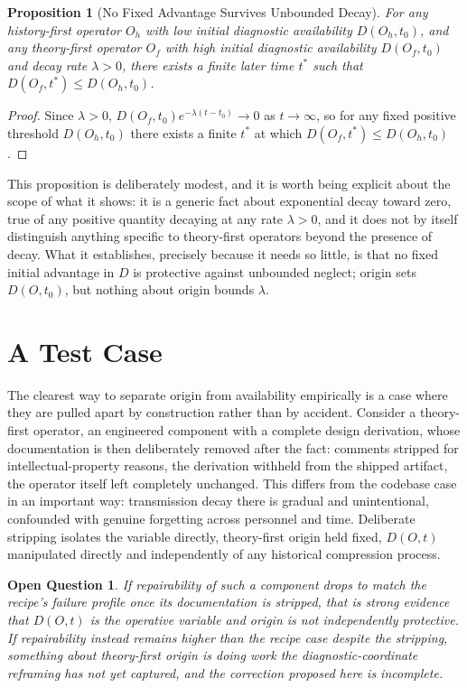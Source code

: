 \documentclass[11pt]{article}
\newtheorem{proposition}{Proposition}[section]
\newtheorem{question}{Open Question}[section]
\begin{document}
\begin{proposition}[No Fixed Advantage Survives Unbounded Decay]
For any history-first operator $O_h$ with low initial diagnostic availability $D(O_h,t_0)$, and any theory-first operator $O_f$ with high initial diagnostic availability $D(O_f,t_0)$ and decay rate $\lambda > 0$, there exists a finite later time $t^*$ such that $D(O_f,t^*) \leq D(O_h,t_0)$.
\end{proposition}

\begin{proof}
Since $\lambda > 0$, $D(O_f,t_0)e^{-\lambda(t-t_0)} \to 0$ as $t \to \infty$, so for any fixed positive threshold $D(O_h,t_0)$ there exists a finite $t^*$ at which $D(O_f,t^*) \leq D(O_h,t_0)$.
\end{proof}

This proposition is deliberately modest, and it is worth being explicit about the scope of what it shows: it is a generic fact about exponential decay toward zero, true of any positive quantity decaying at any rate $\lambda > 0$, and it does not by itself distinguish anything specific to theory-first operators beyond the presence of decay. What it establishes, precisely because it needs so little, is that no fixed initial advantage in $D$ is protective against unbounded neglect; origin sets $D(O,t_0)$, but nothing about origin bounds $\lambda$.

\section{A Test Case}

The clearest way to separate origin from availability empirically is a case where they are pulled apart by construction rather than by accident. Consider a theory-first operator, an engineered component with a complete design derivation, whose documentation is then deliberately removed after the fact: comments stripped for intellectual-property reasons, the derivation withheld from the shipped artifact, the operator itself left completely unchanged. This differs from the codebase case in an important way: transmission decay there is gradual and unintentional, confounded with genuine forgetting across personnel and time. Deliberate stripping isolates the variable directly, theory-first origin held fixed, $D(O,t)$ manipulated directly and independently of any historical compression process.

\begin{question}
If repairability of such a component drops to match the recipe's failure profile once its documentation is stripped, that is strong evidence that $D(O,t)$ is the operative variable and origin is not independently protective. If repairability instead remains higher than the recipe case despite the stripping, something about theory-first origin is doing work the diagnostic-coordinate reframing has not yet captured, and the correction proposed here is incomplete.
\end{question}
\end{document}
